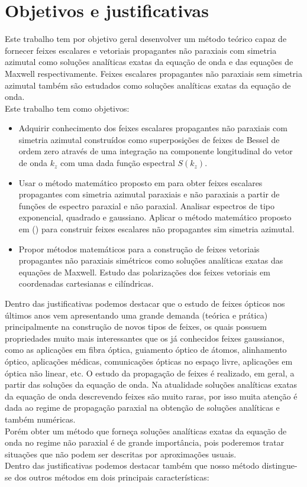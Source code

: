 \section{Objetivos e justificativas}
Este trabalho tem por objetivo geral desenvolver um método teórico capaz de fornecer feixes escalares e vetoriais propagantes não paraxiais com simetria azimutal como soluções analíticas exatas da equação de onda e das equações de Maxwell respectivamente. Feixes escalares propagantes não paraxiais sem simetria azimutal também são estudados como soluções analíticas exatas da equação de onda.\\
Este trabalho tem como objetivos:
\begin{itemize}
\item Adquirir conhecimento dos feixes escalares propagantes não paraxiais com simetria azimutal construídos como superposições de feixes de Bessel de ordem zero através de uma integração na componente longitudinal do vetor de onda $k_z$ com uma dada função espectral $S(k_z)$.
\item Usar o método matemático proposto em  para obter feixes escalares propagantes com simetria azimutal paraxiais e não paraxiais a partir de funções de espectro paraxial e não paraxial. Analisar espectros de tipo exponencial, quadrado e gaussiano. Aplicar o método matemático proposto em (\cite{Lya:2}) para construir feixes escalares não propagantes sim simetria azimutal. 
\item Propor métodos matemáticos para a construção de feixes vetoriais propagantes não paraxiais simétricos como soluções analíticas exatas das equações de Maxwell. Estudo das polarizações dos feixes vetoriais em coordenadas cartesianas e cilíndricas.
\end{itemize}  
Dentro das justificativas podemos destacar que o estudo de feixes ópticos nos últimos anos vem apresentando uma grande demanda (teórica e prática) principalmente na construção de novos tipos de feixes, os quais possuem propriedades muito mais interessantes que os já conhecidos feixes gaussianos, como as aplicações em fibra óptica, guiamento óptico de átomos, alinhamento óptico, aplicações médicas, comunicações ópticas no espaço livre, aplicações em óptica não linear, etc. O estudo da propagação de feixes é realizado, em geral, a partir das soluções da equação de onda. Na atualidade soluções analíticas exatas da equação de onda descrevendo feixes são muito raras, por isso muita atenção é dada ao regime de propagação paraxial na obtenção de soluções analíticas e também numéricas.\\
Porém obter um método que forneça soluções analíticas exatas da equação de onda no regime não paraxial é de grande importância, pois poderemos tratar situações que não podem ser descritas por aproximações usuais.\\
Dentro das justificativas podemos destacar também que nosso método distingue-se dos outros métodos em dois principais características: 
  

